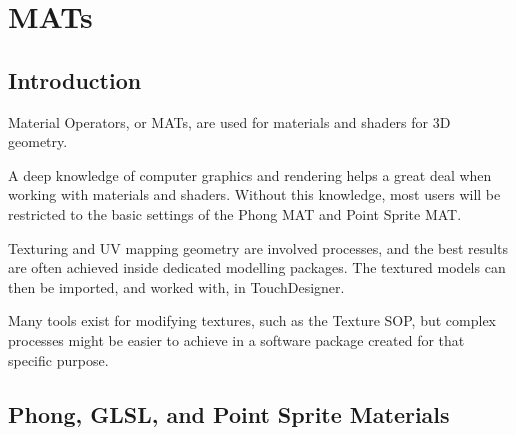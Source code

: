 \cleardoublepage
\chapter{MATs}
\label{ch:8}
 

\section{Introduction}

\begin{fullwidth}
Material Operators, or MATs, are used for materials and shaders for 3D geometry.

A deep knowledge of computer graphics and rendering helps a great deal when working with materials and shaders. Without this knowledge, most users will be restricted to the basic settings of the Phong MAT and Point Sprite MAT.

Texturing and UV mapping geometry are involved processes, and the best results are often achieved inside dedicated modelling packages. The textured models can then be imported, and worked with, in TouchDesigner. 

Many tools exist for modifying textures, such as the Texture SOP, but complex processes might be easier to achieve in a software package created for that specific purpose.

\end{fullwidth}


\section{Phong, GLSL, and Point Sprite Materials}

